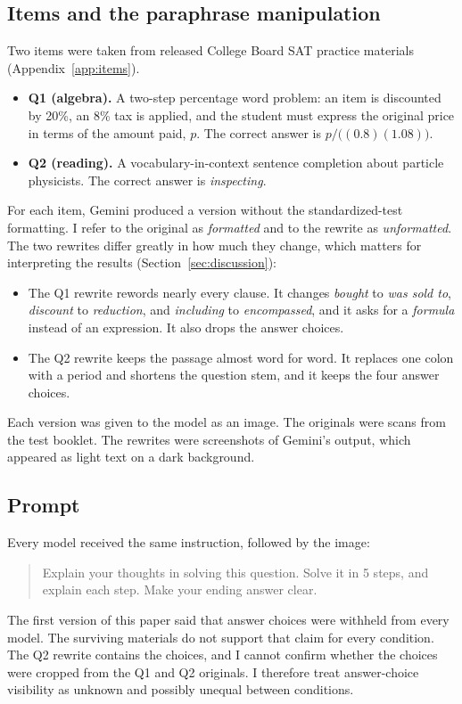 \documentclass[11pt]{article}
\begin{document}
\subsection{Items and the paraphrase manipulation}
Two items were taken from released College Board SAT practice materials (Appendix~\ref{app:items}).
\begin{itemize}
  \item \textbf{Q1 (algebra).} A two-step percentage word problem: an item is discounted by 20\%, an 8\% tax is applied, and the student must express the original price in terms of the amount paid, $p$. The correct answer is $p/\bigl((0.8)(1.08)\bigr)$.
  \item \textbf{Q2 (reading).} A vocabulary-in-context sentence completion about particle physicists. The correct answer is \emph{inspecting}.
\end{itemize}
For each item, Gemini produced a version without the standardized-test formatting. I refer to the original as \emph{formatted} and to the rewrite as \emph{unformatted}. The two rewrites differ greatly in how much they change, which matters for interpreting the results (Section~\ref{sec:discussion}):
\begin{itemize}
  \item The Q1 rewrite rewords nearly every clause. It changes \emph{bought} to \emph{was sold to}, \emph{discount} to \emph{reduction}, and \emph{including} to \emph{encompassed}, and it asks for a \emph{formula} instead of an expression. It also drops the answer choices.
  \item The Q2 rewrite keeps the passage almost word for word. It replaces one colon with a period and shortens the question stem, and it keeps the four answer choices.
\end{itemize}
Each version was given to the model as an image. The originals were scans from the test booklet. The rewrites were screenshots of Gemini's output, which appeared as light text on a dark background.

\subsection{Prompt}
Every model received the same instruction, followed by the image:
\begin{quote}\raggedright
\footnotesize\ttfamily Explain your thoughts in solving this question. Solve it in 5 steps, and explain each step. Make your ending answer clear.
\end{quote}
The first version of this paper said that answer choices were withheld from every model. The surviving materials do not support that claim for every condition. The Q2 rewrite contains the choices, and I cannot confirm whether the choices were cropped from the Q1 and Q2 originals. I therefore treat answer-choice visibility as unknown and possibly unequal between conditions.
\end{document}
